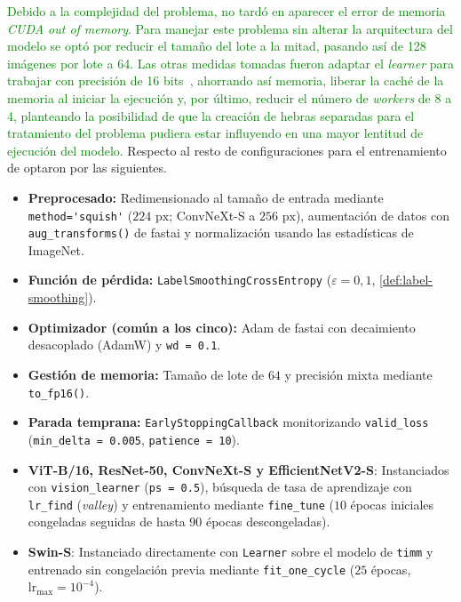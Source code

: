 \textcolor{green}{
Debido a la complejidad del problema, no tardó en aparecer el error de memoria \emph{CUDA out of memory}. Para manejar este problema sin alterar la arquitectura del modelo  se optó por reducir el tamaño del lote a la mitad, pasando así de 128 imágenes por lote a 64. Las otras medidas tomadas fueron adaptar el \emph{learner} para trabajar con precisión de 16 bits~\cite{micikevicius2018}, ahorrando así memoria, liberar la caché de la memoria al iniciar la ejecución y, por último, reducir el número de \emph{workers} de 8 a 4, planteando la posibilidad de que la creación de hebras separadas para el tratamiento del problema pudiera estar influyendo en una mayor lentitud de ejecución del modelo.
}
Respecto al resto de configuraciones para el entrenamiento de optaron por las siguientes.
\begin{itemize}
  \item \textbf{Preprocesado:} Redimensionado al tamaño de entrada mediante \nolinkurl{method='squish'} ($224\text{ px}$; ConvNeXt-S a $256\text{ px}$), aumentación de datos con \nolinkurl{aug_transforms()} de fastai y normalización usando las estadísticas de ImageNet.
  \item \textbf{Función de pérdida:} \texttt{LabelSmoothing\allowbreak CrossEntropy} ($\varepsilon = 0{,}1$, \cref{def:label-smoothing}).
  \item \textbf{Optimizador (común a los cinco):} Adam de fastai con decaimiento desacoplado (AdamW) y \texttt{wd = 0.1}.
  \item \textbf{Gestión de memoria:} Tamaño de lote de $64$ y precisión mixta mediante \nolinkurl{to_fp16()}.
  \item \textbf{Parada temprana:} \texttt{EarlyStopping\allowbreak Callback} monitorizando \nolinkurl{valid_loss} (\nolinkurl{min_delta = 0.005}, \nolinkurl{patience = 10}).
  \item \textbf{ViT-B/16, ResNet-50, ConvNeXt-S y EfficientNetV2-S}: Instanciados con \nolinkurl{vision_learner} (\texttt{ps = 0.5}), búsqueda de tasa de aprendizaje con \nolinkurl{lr_find} (\textit{valley}) y entrenamiento mediante \nolinkurl{fine_tune} ($10$ épocas iniciales congeladas seguidas de hasta $90$ épocas descongeladas).
  \item \textbf{Swin-S}: Instanciado directamente con \texttt{Learner} sobre el modelo de \texttt{timm} y entrenado sin congelación previa mediante \nolinkurl{fit_one_cycle} ($25$ épocas, $\text{lr}_{\max} = 10^{-4}$).
\end{itemize}
